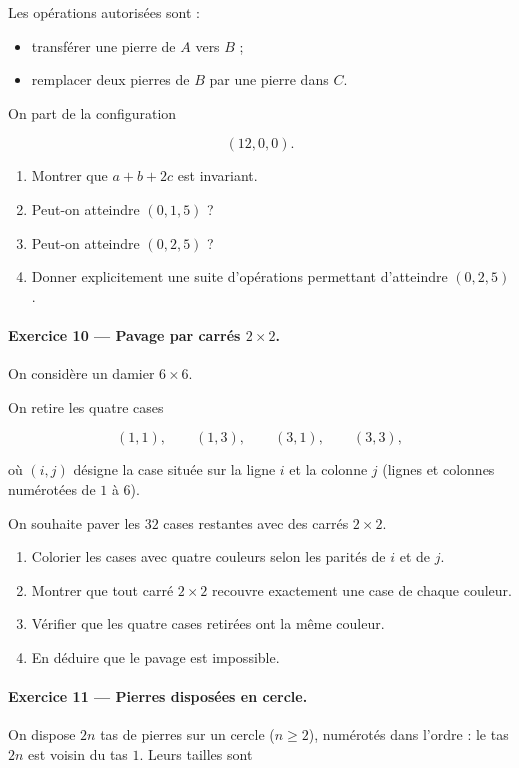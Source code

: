 Les opérations autorisées sont :

\begin{itemize}
    \item transférer une pierre de \(A\) vers \(B\) ;
    \item remplacer deux pierres de \(B\) par une pierre dans \(C\).
\end{itemize}

On part de la configuration

\[
(12,0,0).
\]

\begin{enumerate}
    \item Montrer que \(a+b+2c\) est invariant.
    \item Peut-on atteindre \((0,1,5)\) ?
    \item Peut-on atteindre \((0,2,5)\) ?
    \item Donner explicitement une suite d'opérations permettant d'atteindre
    \((0,2,5)\).
\end{enumerate}

\paragraph{Exercice 10 --- Pavage par carrés \(2\times2\).}
On considère un damier \(6\times6\).

On retire les quatre cases

\[
(1,1),\qquad(1,3),\qquad(3,1),\qquad(3,3),
\]

où \((i,j)\) désigne la case située sur la ligne \(i\) et la colonne \(j\)
(lignes et colonnes numérotées de \(1\) à \(6\)).

On souhaite paver les \(32\) cases restantes avec des carrés \(2\times2\).

\begin{enumerate}
    \item Colorier les cases avec quatre couleurs selon les parités de \(i\) et
    de \(j\).
    \item Montrer que tout carré \(2\times2\) recouvre exactement une case de
    chaque couleur.
    \item Vérifier que les quatre cases retirées ont la même couleur.
    \item En déduire que le pavage est impossible.
\end{enumerate}

\paragraph{Exercice 11 --- Pierres disposées en cercle.}
On dispose \(2n\) tas de pierres sur un cercle (\(n\geq2\)), numérotés
dans l'ordre : le tas \(2n\) est voisin du tas \(1\). Leurs tailles sont

